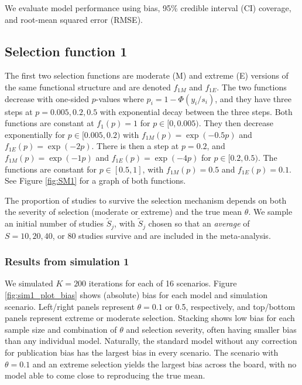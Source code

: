 \documentclass[12pt]{article}   	%
\numberwithin{equation}{section}
\begin{document}
We evaluate model performance using bias, 95\% credible interval (CI) coverage, and root-mean squared error (RMSE). 

\subsection{Selection function 1}

The first two selection functions are moderate (M) and extreme (E) versions of the same functional structure and are denoted $f_{1M}$ and $f_{1E}$. The two functions decrease with one-sided $p$-values where $p_i = 1 - \Phi(y_i / s_i)$, and they have three steps at $p = 0.005, 0.2, 0.5$ with exponential decay between the three steps. Both functions are constant at $f_1(p) = 1$ for $p \in [0, 0.005)$. They then decrease exponentially for $p \in [0.005, 0.2)$ with $f_{1M}(p) = \exp(-0.5p)$ and $f_{1E}(p) = \exp(-2p)$. There is then a step at $p=0.2$, and $f_{1M}(p) = \exp(-1p)$ and $f_{1E}(p) = \exp(-4p)$ for $p \in [0.2, 0.5)$. The functions are constant for $p \in [0.5, 1]$, with $f_{1M}(p) = 0.5$ and $f_{1E}(p) = 0.1$. See Figure \ref{fig:SM1} for a graph of both functions. 

The proportion of studies to survive the selection mechanism depends on both the severity of selection (moderate or extreme) and the true mean $\theta$. We sample an initial number of studies $\widetilde{S}_j$, with $\widetilde{S}_j$ chosen so that an \textit{average} of $S = 10, 20, 40$, or 80 studies survive and are included in the meta-analysis. 

\subsubsection{Results from simulation 1}

We simulated $K=200$ iterations for each of 16 scenarios. Figure \ref{fig:sim1_plot_bias} shows (absolute) bias for each model and simulation scenario. Left/right panels represent $\theta=0.1$ or 0.5, respectively, and top/bottom panels represent extreme or moderate selection. Stacking shows low bias for each sample size and combination of $\theta$ and selection severity, often having smaller bias than any individual model. Naturally, the standard model without any correction for publication bias has the largest bias in every scenario. The scenario with $\theta=0.1$ and an extreme selection yields the largest bias across the board, with no model able to come close to reproducing the true mean. 
\end{document}
